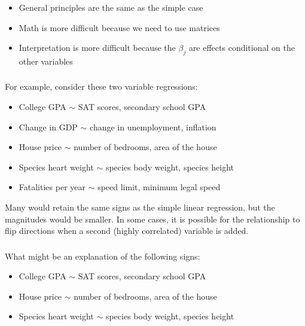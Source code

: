 \begin{frame}[fragile] \frametitle{}


\begin{itemize}
\item General principles are the same as the simple case \pause
\item Math is more difficult because we need to use matrices \pause
\item Interpretation is more difficult because the $\beta_j$ are effects
conditional on the other variables
\end{itemize}

\end{frame}


\begin{frame}[fragile] \frametitle{}

For example, consider these two variable regressions:
\begin{itemize}
\item College GPA $\sim$ SAT scores, secondary school GPA
\item Change in GDP $\sim$ change in unemployment, inflation
\item House price $\sim$ number of bedrooms, area of the house
\item Species heart weight $\sim$ species body weight, species height
\item Fatalities per year $\sim$ speed limit, minimum legal speed
\end{itemize}

\pause
Many would retain the same signs as the simple linear regression, but
the magnitudes would be smaller. In some cases, it is possible for
the relationship to flip directions when a second (highly correlated)
variable is added.

\end{frame}

\begin{frame}[fragile] \frametitle{}

What might be an explanation of the following signs:
\begin{itemize}
\item College GPA $\sim$ {\color{solarized@red} SAT scores}, {\color{solarized@green} secondary school GPA} \pause
\item House price $\sim$ {\color{solarized@green} number of bedrooms},
      {\color{solarized@red} area of the house} \pause
\item Species heart weight $\sim$ {\color{solarized@green} species body weight}, {\color{solarized@red} species height}
\end{itemize}

\end{frame}



